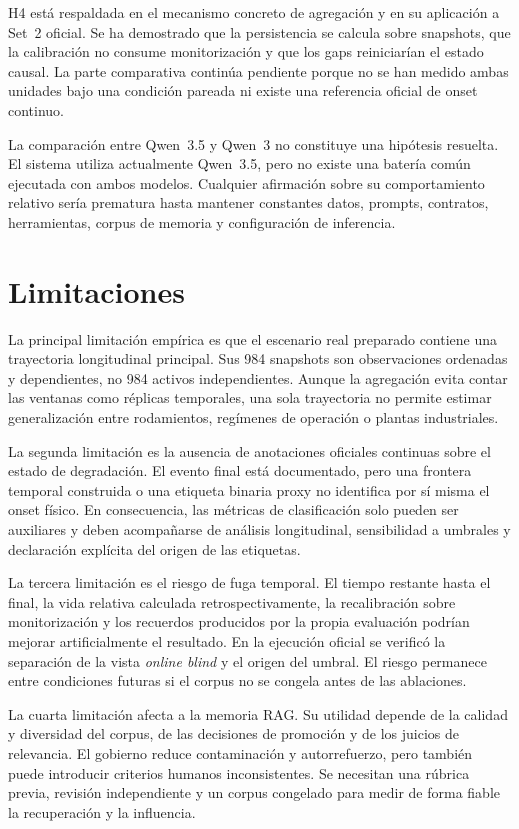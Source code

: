 H4 está respaldada en el mecanismo concreto de agregación y en su aplicación a
Set~2 oficial. Se ha demostrado que la persistencia se calcula sobre snapshots,
que la calibración no consume monitorización y que los gaps reiniciarían el
estado causal. La parte comparativa continúa pendiente porque no se han medido
ambas unidades bajo una condición pareada ni existe una referencia oficial de
onset continuo.

La comparación entre Qwen~3.5 y Qwen~3 no constituye una hipótesis resuelta. El
sistema utiliza actualmente Qwen~3.5, pero no existe una batería común ejecutada
con ambos modelos. Cualquier afirmación sobre su comportamiento relativo sería
prematura hasta mantener constantes datos, prompts, contratos, herramientas,
corpus de memoria y configuración de inferencia.

\section{Limitaciones}

La principal limitación empírica es que el escenario real preparado contiene
una trayectoria longitudinal principal. Sus 984 snapshots son observaciones
ordenadas y dependientes, no 984 activos independientes. Aunque la agregación
evita contar las ventanas como réplicas temporales, una sola trayectoria no
permite estimar generalización entre rodamientos, regímenes de operación o
plantas industriales.

La segunda limitación es la ausencia de anotaciones oficiales continuas sobre
el estado de degradación. El evento final está documentado, pero una frontera
temporal construida o una etiqueta binaria proxy no identifica por sí misma el
onset físico. En consecuencia, las métricas de clasificación solo pueden ser
auxiliares y deben acompañarse de análisis longitudinal, sensibilidad a
umbrales y declaración explícita del origen de las etiquetas.

La tercera limitación es el riesgo de fuga temporal. El tiempo restante hasta
el final, la vida relativa calculada retrospectivamente, la recalibración sobre
monitorización y los recuerdos producidos por la propia evaluación podrían
mejorar artificialmente el resultado. En la ejecución oficial se verificó la
separación de la vista \textit{online blind} y el origen del umbral. El riesgo
permanece entre condiciones futuras si el corpus no se congela antes de las
ablaciones.

La cuarta limitación afecta a la memoria RAG\@. Su utilidad depende de la calidad
y diversidad del corpus, de las decisiones de promoción y de los juicios de
relevancia. El gobierno reduce contaminación y autorrefuerzo, pero también puede
introducir criterios humanos inconsistentes. Se necesitan una rúbrica previa,
revisión independiente y un corpus congelado para medir de forma fiable la
recuperación y la influencia.

